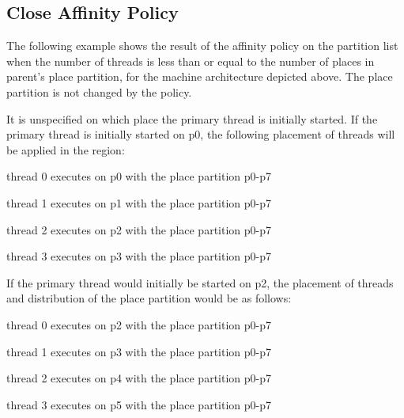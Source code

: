 \subsection{Close Affinity Policy}
\label{subsec:affinity_close}

The following example shows the result of the  affinity policy on 
the partition list when the number of threads is less than or equal to the number 
of places in parent's place partition, for the machine architecture depicted above. 
The place partition is not changed by the  policy.

\clearpage


It is unspecified on which place the primary thread is initially started. If the 
primary thread is initially started on p0, the following placement of threads will 
be applied in the  region:

\begin{compactitem}
\item thread 0 executes on p0 with the place partition p0-p7

\item thread 1 executes on p1 with the place partition p0-p7

\item thread 2 executes on p2 with the place partition p0-p7

\item thread 3 executes on p3 with the place partition p0-p7
\end{compactitem}

If the primary thread would initially be started on p2, the placement of threads 
and distribution of the place partition would be as follows:

\begin{compactitem}
\item thread 0 executes on p2 with the place partition p0-p7

\item thread 1 executes on p3 with the place partition p0-p7

\item thread 2 executes on p4 with the place partition p0-p7

\item thread 3 executes on p5 with the place partition p0-p7
\end{compactitem}

